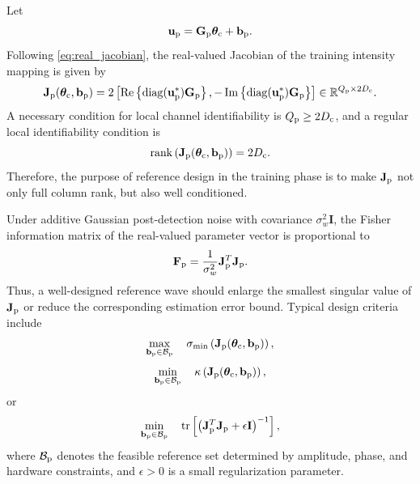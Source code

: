 \documentclass[journal]{IEEEtran}
\begin{document}
Let
\begin{equation}
\mathbf{u}_{\rm p}
=
\mathbf{G}_{\rm p}\boldsymbol{\theta}_{\rm c}
+
\mathbf{b}_{\rm p}.
\end{equation}
Following \eqref{eq:real_jacobian}, the real-valued Jacobian of the training intensity mapping is given by
\begin{equation}
\mathbf{J}_{\rm p}(\boldsymbol{\theta}_{\rm c},\mathbf{b}_{\rm p})
=
2
\left[
\operatorname{Re}
\left\{
\operatorname{diag}(\mathbf{u}_{\rm p}^*)\mathbf{G}_{\rm p}
\right\},
-
\operatorname{Im}
\left\{
\operatorname{diag}(\mathbf{u}_{\rm p}^*)\mathbf{G}_{\rm p}
\right\}
\right]
\in\mathbb{R}^{Q_{\rm p}\times 2D_{\rm c}}.
\label{eq:training_jacobian}
\end{equation}
A necessary condition for local channel identifiability is $Q_{\rm p}\geq 2D_{\rm c}$, and a regular local identifiability condition is
\begin{equation}
\operatorname{rank}
\left(
\mathbf{J}_{\rm p}(\boldsymbol{\theta}_{\rm c},\mathbf{b}_{\rm p})
\right)
=
2D_{\rm c}.
\label{eq:training_jacobian_rank_condition}
\end{equation}
Therefore, the purpose of reference design in the training phase is to make $\mathbf{J}_{\rm p}$ not only full column rank, but also well conditioned.

Under additive Gaussian post-detection noise with covariance $\sigma_w^2\mathbf{I}$, the Fisher information matrix of the real-valued parameter vector is proportional to
\begin{equation}
\mathbf{F}_{\rm p}
=
\frac{1}{\sigma_w^2}
\mathbf{J}_{\rm p}^T
\mathbf{J}_{\rm p}.
\label{eq:training_fim}
\end{equation}
Thus, a well-designed reference wave should enlarge the smallest singular value of $\mathbf{J}_{\rm p}$ or reduce the corresponding estimation error bound. 
Typical design criteria include
\begin{equation}
\max_{\mathbf{b}_{\rm p}\in\mathcal{B}_{\rm p}}
\quad
\sigma_{\min}
\left(
\mathbf{J}_{\rm p}(\boldsymbol{\theta}_{\rm c},\mathbf{b}_{\rm p})
\right),
\label{eq:reference_design_sigma_min}
\end{equation}
\begin{equation}
\min_{\mathbf{b}_{\rm p}\in\mathcal{B}_{\rm p}}
\quad
\kappa
\left(
\mathbf{J}_{\rm p}(\boldsymbol{\theta}_{\rm c},\mathbf{b}_{\rm p})
\right),
\label{eq:reference_design_condition_number}
\end{equation}
or
\begin{equation}
\min_{\mathbf{b}_{\rm p}\in\mathcal{B}_{\rm p}}
\quad
\operatorname{tr}
\left[
\left(
\mathbf{J}_{\rm p}^T
\mathbf{J}_{\rm p}
+
\epsilon\mathbf{I}
\right)^{-1}
\right],
\label{eq:reference_design_a_optimal}
\end{equation}
where $\mathcal{B}_{\rm p}$ denotes the feasible reference set determined by amplitude, phase, and hardware constraints, and $\epsilon>0$ is a small regularization parameter.
\end{document}
